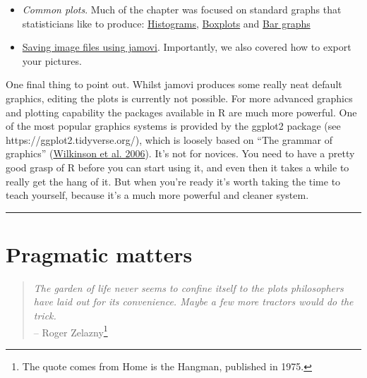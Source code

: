 \documentclass[
]{book}
\providecommand{\tightlist}{%
  \setlength{\itemsep}{0pt}\setlength{\parskip}{0pt}}
\begin{document}
\begin{itemize}
\tightlist
\item
  \emph{Common plots}. Much of the chapter was focused on standard graphs that statisticians like to produce: \protect\hyperlink{histograms}{Histograms}, \protect\hyperlink{boxplots}{Boxplots} and \protect\hyperlink{bar-graphs}{Bar graphs}
\item
  \protect\hyperlink{saving-image-files-using-jamovi}{Saving image files using jamovi}. Importantly, we also covered how to export your pictures.
\end{itemize}

One final thing to point out. Whilst jamovi produces some really neat default graphics, editing the plots is currently not possible. For more advanced graphics and plotting capability the packages available in R are much more powerful. One of the most popular graphics systems is provided by the ggplot2 package (see https://ggplot2.tidyverse.org/), which is loosely based on ``The grammar of graphics'' (\protect\hyperlink{ref-Wilkinson2006}{Wilkinson et al. 2006}). It's not for novices. You need to have a pretty good grasp of R before you can start using it, and even then it takes a while to really get the hang of it. But when you're ready it's worth taking the time to teach yourself, because it's a much more powerful and cleaner system.

\begin{center}\rule{0.5\linewidth}{0.5pt}\end{center}

\hypertarget{pragmatic-matters}{%
\chapter{Pragmatic matters}\label{pragmatic-matters}}

\begin{quote}
\emph{The garden of life never seems to confine itself to the plots philosophers have laid out for its convenience. Maybe a few more tractors would do the trick.}\\
-- Roger Zelazny\footnote{The quote comes from Home is the Hangman, published in 1975.}
\end{quote}
\end{document}
